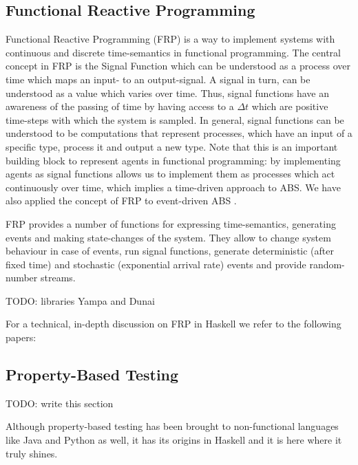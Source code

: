 \subsection{Functional Reactive Programming}
\label{sec:frp}
Functional Reactive Programming (FRP) is a way to implement systems with continuous and discrete time-semantics in functional programming. The central concept in FRP is the Signal Function which can be understood as a process over time which maps an input- to an output-signal. A signal in turn, can be understood as a value
which varies over time. Thus, signal functions have an awareness of the passing of time by having access to a $\Delta t$ which are positive time-steps with which the system is sampled. In general, signal functions can be understood to be computations that represent processes, which have an input of a specific type, process it and output a new type. Note that this is an important building block to represent agents in functional programming: by implementing agents as signal functions allows us to implement them as processes which act continuously over time, which implies a time-driven approach to ABS. We have also applied the concept of FRP to event-driven ABS \citep{meyer_event-driven_2014}.

FRP provides a number of functions for expressing time-semantics, generating events and making state-changes of the system. They allow to change system behaviour in case of events, run signal functions, generate deterministic (after fixed time) and stochastic (exponential arrival rate) events and provide random-number streams. 

TODO: libraries Yampa and Dunai

For a technical, in-depth discussion on FRP in Haskell we refer to the following papers: \citep{wan_functional_2000, hughes_generalising_2000, hughes_programming_2005, nilsson_functional_2002, hudak_arrows_2003, courtney_yampa_2003, perez_functional_2016, perez_extensible_2017}

\subsection{Property-Based Testing}
TODO: write this section

Although property-based testing has been brought to non-functional languages like Java and Python as well, it has its origins in Haskell and it is here where it truly shines.

